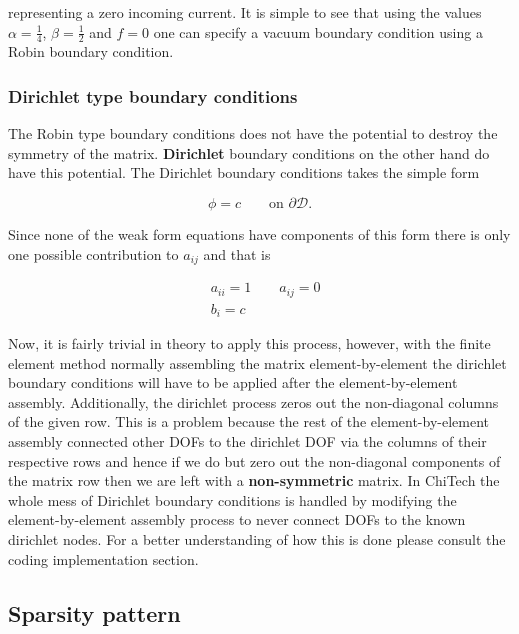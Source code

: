 \documentclass[11pt,letterpaper,titlepage]{article}
\newcommand{\bOmega}{\mathcal{D}}
\numberwithin{equation}{section}
\begin{document}
representing a zero incoming current. It is simple to see that using the values $\alpha = \frac{1}{4}$, $\beta=\frac{1}{2}$ and $f=0$ one can specify a vacuum boundary condition using a Robin boundary condition.

\subsubsection{Dirichlet type boundary conditions}
The Robin type boundary conditions does not have the potential to destroy the symmetry of the matrix. \textbf{Dirichlet} boundary conditions on the other hand do have this potential. The Dirichlet boundary conditions takes the simple form

\begin{equation*}
\phi = c \quad \quad \text{on } \partial \bOmega.
\end{equation*}

Since none of the weak form equations have components of this form there is only one possible contribution to $a_{ij}$ and that is

\begin{equation*}
\begin{aligned}
&a_{ii} \mathbf{=} 1 \quad \quad a_{ij}=0\\
&b_i = c
\end{aligned}
\end{equation*}

Now, it is fairly trivial in theory to apply this process, however, with the finite element method normally assembling the matrix element-by-element the dirichlet boundary conditions will have to be applied after the element-by-element assembly. Additionally, the dirichlet process zeros out the non-diagonal columns of the given row. This is a problem because the rest of the element-by-element assembly connected other DOFs to the dirichlet DOF via the columns of their respective rows and hence if we do but zero out the non-diagonal components of the matrix row then we are left with a \textbf{non-symmetric} matrix.
\newline
\newline
In ChiTech the whole mess of Dirichlet boundary conditions is handled by modifying the element-by-element assembly process to never connect DOFs to the known dirichlet nodes. For a better understanding of how this is done please consult the coding implementation section.

\newpage
\subsection{Sparsity pattern}
\end{document}
